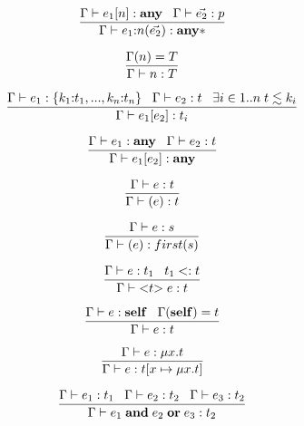 \[
\dfrac{\Gamma \vdash e_{1}[n]:\mathbf{any} \;\;\;
       \Gamma \vdash \vec{e_{2}}:p}
      {\Gamma \vdash e_{1}{:}n(\vec{e_{2}}):\mathbf{any}{*}}
\]

\[
\dfrac{\Gamma(n) = T}
      {\Gamma \vdash n:T}
\]

\[
\dfrac{\Gamma \vdash e_{1}:\{k_{1}{:}t_{1}, ..., k_{n}{:}t_{n}\} \;\;\;
       \Gamma \vdash e_{2}:t \;\;\;
       \exists i \in 1{..}n \; t \lesssim k_{i}}
      {\Gamma \vdash e_{1}[e_{2}]:t_{i}}
\]

\[
\dfrac{\Gamma \vdash e_{1}:\mathbf{any} \;\;\;
       \Gamma \vdash e_{2}:t}
      {\Gamma \vdash e_{1}[e_{2}]:\mathbf{any}}
\]

\[
\dfrac{\Gamma \vdash e:t}
      {\Gamma \vdash (e):t}
\]

\[
\dfrac{\Gamma \vdash e:s}
      {\Gamma \vdash (e):first(s)}
\]

\[
\dfrac{\Gamma \vdash e:t_{1} \;\;\;
       t_{1} <: t}
      {\Gamma \vdash {<}t{>} \; e:t}
\]

\[
\dfrac{\Gamma \vdash e:\mathbf{self} \;\;\;
       \Gamma(\mathbf{self}) = t}
      {\Gamma \vdash e:t}
\]

\[
\dfrac{\Gamma \vdash e:\mu x.t}
      {\Gamma \vdash e:t[x \mapsto \mu x.t]}
\]

\[
\dfrac{\Gamma \vdash e_{1}:t_{1} \;\;\;
       \Gamma \vdash e_{2}:t_{2} \;\;\;
       \Gamma \vdash e_{3}:t_{2}}
      {\Gamma \vdash e_{1} \; \mathbf{and} \; e_{2} \; \mathbf{or} \; e_{3}:t_{2}}
\]

